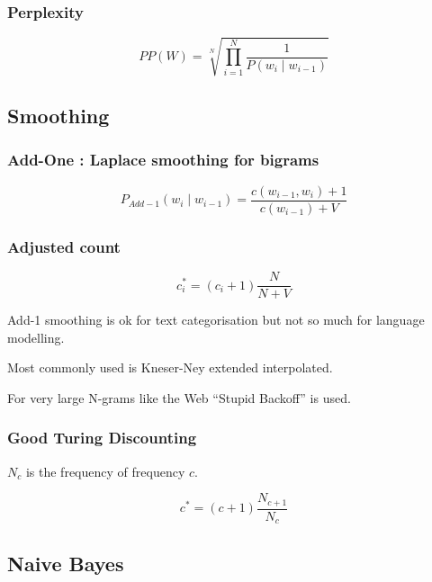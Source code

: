 \subsubsection{Perplexity}

\begin{equation}
PP\left(W\right) = \sqrt[N]{\prod_{i=1}^{N}\frac{1}{P\left(w_i \mid w_{i-1}\right)}}
\end{equation}

\subsection{Smoothing}

\subsubsection{Add-One : Laplace smoothing  for bigrams}

\begin{equation}
P_{Add-1}\left(w_i \mid w_{i-1}\right) = \frac{c\left(w_{i-1}, w_i\right) + 1}{c\left(w_{i-1} \right) + V}
\end{equation}

\subsubsection{Adjusted count}

\begin{equation}
c_i^* = \left(c_i+1\right)\frac{N}{N+V}
\end{equation}

Add-1 smoothing is ok for text categorisation but not so much for language modelling.

Most commonly used is Kneser-Ney extended interpolated.

For very large N-grams like the Web “Stupid Backoff” is used.

\subsubsection{Good Turing Discounting}

$N_c$ is the frequency of frequency $c$.

\begin{equation}
c^* = \left(c+1\right)\frac{N_{c+1}}{N_c}
\end{equation}

\subsection{Naive Bayes}

